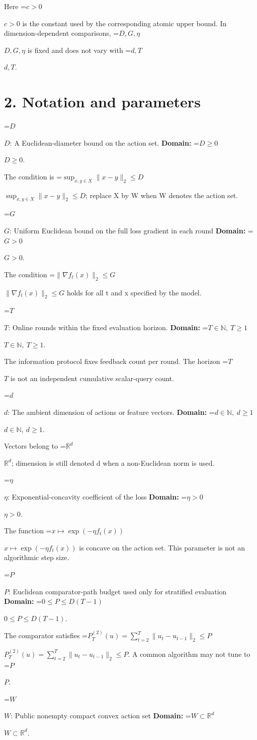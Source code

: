 \documentclass[10pt,a4paper]{article}
\newcommand{\AtlasMath}[1]{\par\begingroup\centering\setbox0=\hbox{$\displaystyle #1$}\ifdim\wd0>1.4\linewidth\typeout{ATLAS WIDE FORMULA: \the\wd0}\fi\ifdim\wd0>\linewidth\resizebox{\linewidth}{!}{\box0}\else\box0\fi\par\endgroup}
\newcommand{\AtlasInlineMath}[1]{\begingroup\setbox0=\hbox{$#1$}\ifdim\wd0>.4\linewidth\endgroup\AtlasMath{#1}\else\endgroup$#1$\fi}
\begin{document}
Here \AtlasInlineMath{c>0} is the constant used by the corresponding atomic upper bound. In dimension-dependent comparisons, \AtlasInlineMath{D,G,\eta} is fixed and does not vary with \AtlasInlineMath{d,T}.

\section{2. Notation and parameters}
\AtlasInlineMath{D}: A Euclidean-diameter bound on the action set. \textbf{Domain:} \AtlasInlineMath{D\ge0}.

The condition is \AtlasInlineMath{\sup_{x,y\in X}\|x-y\|_2\le D}; replace X by W when W denotes the action set.

\AtlasInlineMath{G}: Uniform Euclidean bound on the full loss gradient in each round \textbf{Domain:} \AtlasInlineMath{G>0}.

The condition \AtlasInlineMath{\|\nabla f_t(x)\|_2\le G} holds for all t and x specified by the model.

\AtlasInlineMath{T}: Online rounds within the fixed evaluation horizon. \textbf{Domain:} \AtlasInlineMath{T\in\mathbb N,\ T\ge1}.

The information protocol fixes feedback count per round. The horizon \AtlasInlineMath{T} is not an independent cumulative scalar-query count.

\AtlasInlineMath{d}: The ambient dimension of actions or feature vectors. \textbf{Domain:} \AtlasInlineMath{d\in\mathbb N,\ d\ge1}.

Vectors belong to \AtlasInlineMath{\mathbb R^d}; dimension is still denoted d when a non-Euclidean norm is used.

\AtlasInlineMath{\eta}: Exponential-concavity coefficient of the loss \textbf{Domain:} \AtlasInlineMath{\eta>0}.

The function \AtlasInlineMath{x\mapsto\exp(-\eta f_t(x))} is concave on the action set. This parameter is not an algorithmic step size.

\AtlasInlineMath{P}: Euclidean comparator-path budget used only for stratified evaluation \textbf{Domain:} \AtlasInlineMath{0\le P\le D(T-1)}.

The comparator satisfies \AtlasInlineMath{P_T^{(2)}(u)=\sum_{t=2}^T\|u_t-u_{t-1}\|_2\le P}. A common algorithm may not tune to \AtlasInlineMath{P}.

\AtlasInlineMath{W}: Public nonempty compact convex action set \textbf{Domain:} \AtlasInlineMath{W\subset\mathbb R^d}.
\end{document}
